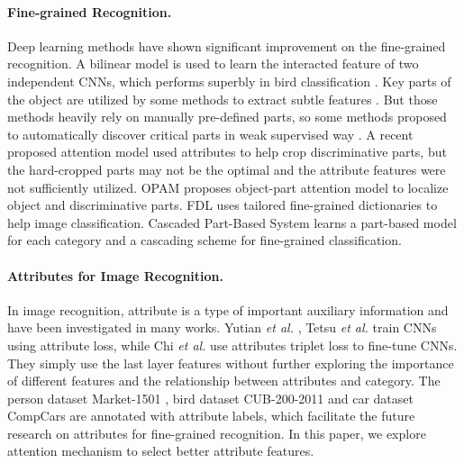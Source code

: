 \documentclass[sigconf]{acmart}
\begin{document}
\paragraph{Fine-grained Recognition.}  Deep learning methods have shown significant improvement on the fine-grained recognition. A bilinear model is used to learn the interacted feature of two independent CNNs, which performs superbly in bird classification \cite{lin2015bilinear}. Key parts of the object are utilized by some methods to extract subtle features \cite{zhang2014part, branson2014bird}. But those methods heavily rely on manually pre-defined parts, so some methods proposed to automatically discover critical parts in weak supervised way \cite{zhang2016picking, fu2017look}. A recent proposed attention model \cite{liu2017localizing} used attributes to help crop discriminative parts, but the hard-cropped parts may not be the optimal and the attribute features were not sufficiently utilized. OPAM \cite{peng2018object} proposes object-part attention model to localize object and discriminative parts. FDL \cite{shu2016image} uses tailored fine-grained dictionaries to help image classification. Cascaded Part-Based System \cite{biglari2018cascaded} learns a part-based model for each category and a cascading scheme for fine-grained classification.

\paragraph{Attributes for Image Recognition.} In image recognition, attribute is a type of important auxiliary information \cite{lampert2009learning, layne2012person} and have been investigated in many works. Yutian \emph{et al.} \cite{lin2017improving}, Tetsu \emph{et al.} \cite{matsukawa2016person} train CNNs using attribute loss, while Chi \emph{et al.} \cite{su2016deep} use attributes triplet loss to fine-tune CNNs. They simply use the last layer features without further exploring the importance of different features and the relationship between attributes and category. The person dataset Market-1501 \cite{Zheng2015Scalable}, bird dataset CUB-200-2011 \cite{wah2011caltech} and car dataset CompCars \cite{yang2015large} are annotated with attribute labels, which facilitate the future research on attributes for fine-grained recognition. In this paper, we explore attention mechanism to select better attribute features.
\end{document}
